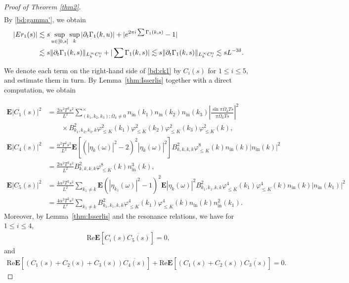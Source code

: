 \documentclass[UTF-8,reqno]{amsart}
\numberwithin{equation}{section}
\theoremstyle{definition}
\def\leq{\leqslant}
\def\leq{\leqslant}
\begin{document}
\begin{proof}[Proof of Theorem \ref{thm2}]
\begin{align}
\end{align}
By \eqref{bd:gamma'}, we obtain
\begin{align}
   | Er_1(s)|&\lesssim s\sup_{u\in[0,s]}\sup_k|\partial_t\Gamma_1(k,u)|+|e^{2\pi i \sum\Gamma_1(k,s)}-1|\notag\\
   &\lesssim s \|\partial_t\Gamma_1(k,s)\|_{L_k^\infty C^0_s}+|  \sum\Gamma_1(k,s)|\lesssim s \|\partial_t\Gamma_1(k,s)\|_{L_k^\infty C^0_s}\lesssim sL^{-3\delta}.\label{def:er}
\end{align}

We denote each term on the right-hand side of \eqref{bd:ck1} by $C_i(s)$ for $1 \leq i \leq 5$, and estimate them in turn.   By Lemma~\ref{thm:Isserlis} together with a direct computation, we obtain

\begin{align*}
\mathbf{E}|C_1(s)|^2&=\frac{2\alpha^2T^2s^2
}{L^{2}}\sum_{(k_1, k_2, k_3); \overline \Omega_k\neq 0}^\times n_{\mathrm{in}}(k_1)n_{\mathrm{in}}(k_2)n_{\mathrm{in}}(k_3)\left|\frac{\sin \pi\overline \Omega _kTs}{\pi \overline\Omega _kTs}\right|^2\\
&\quad\quad\times B^2_{k_1,k_2,k_3,k}\varphi_{\leq K}^2(k_1)\varphi_{\leq K}^2(k_2)\varphi_{\leq K}^2(k_3)\varphi_{\leq K}^2(k),\\
\mathbf{E}|C_4(s)|^2&=\frac{\alpha^2 T^2s^2}{L^{2}}\mathbf{E}[(|\eta_{k}(\omega)|^2 -2 )^2|\eta_{k}(\omega)|^2]B^2_{k,k,k,k}\varphi_{\leq K}^8(k)n_{\mathrm{in}}(k)|n_{\mathrm{in}}(k)|^2\\
&=\frac{2\alpha^2 T^2s^2}{L^{2}}B^2_{k,k,k,k}\varphi_{\leq K}^8(k)n_{\mathrm{in}}^3(k),\\
    \mathbf{E}|C_5(s)|^2&=\frac{4\alpha^2 T^2s^2}{L^{2}}\sum_{k_1\neq k}\mathbf{E}(|\eta_{k_1}(\omega)|^2 -1 )^2 \mathbf{E}|\eta_{k}(\omega)|^2 B^2_{k_1,k_1,k,k}\varphi_{\leq K}^4(k_1)\varphi_{\leq K}^4(k)n_{\mathrm{in}}(k)|n_{\mathrm{in}}(k_1)|^2\\
    &=\frac{4\alpha^2 T^2s^2}{L^{2}}\sum_{k_1\neq k}B^2_{k_1,k_1,k,k}\varphi_{\leq K}^4(k_1)\varphi_{\leq K}^4(k)n_{\mathrm{in}}(k)n_{\mathrm{in}}^2(k_1).
\end{align*}
Moreover, by Lemma~\ref{thm:Isserlis} and the resonance relations, we have for $1\leq i\leq 4$, \begin{align*}
   \mathrm{Re} \mathbf{E}[C_i(s)\overline{C_5(s)}]=0,
\end{align*} 
and   \begin{align*}
   \mathrm{Re} \mathbf{E}[(C_1(s)+C_2(s)+C_3(s))\overline{C_4(s)}]+\mathrm{Re} \mathbf{E}[(C_1(s)+C_2(s))\overline{C_3(s)}]=0.
\end{align*}  


\end{proof}
\end{document}
